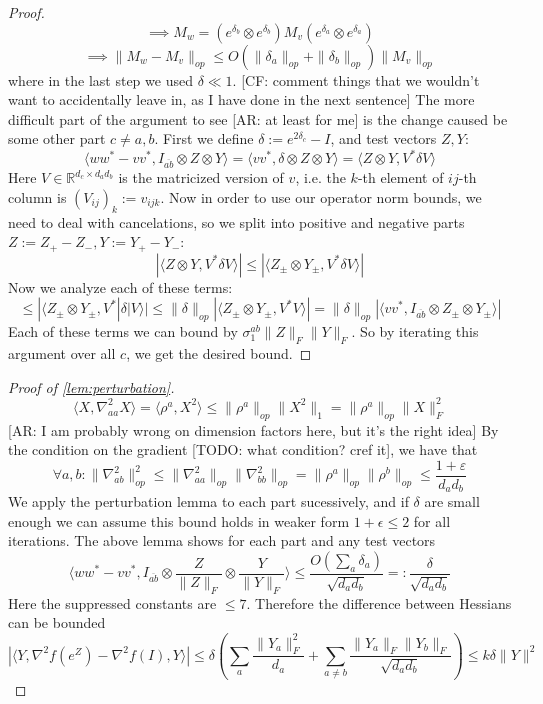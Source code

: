 \documentclass{article}
\newcommand{\R}{{\mathbb{R}}}
\newcommand\eps{\varepsilon}
\newcommand{\CF}[1]{{\color{purple}[CF: #1]}}
\newcommand{\AR}[1]{{\color{orange}[AR: #1]}}
\newcommand{\TODO}[1]{{\color{blue}[TODO: #1]}}
\begin{document}
\begin{proof}
\[ \implies M_{w} = (e^{\delta_{b}} \otimes e^{\delta_{b}}) M_{v} (e^{\delta_{a}} \otimes e^{\delta_{a}})   \]
\[ \implies \|M_{w} - M_{v}\|_{op} \leq O(\|\delta_{a}\|_{op} + \|\delta_{b}\|_{op}) \|M_{v}\|_{op}   \]
where in the last step we used $\delta \ll 1$.
\CF{comment things that we wouldn't want to accidentally leave in, as I have done in the next sentence}
The more difficult part of the argument to see \AR{at least for me} is the change caused be some other part $c \neq a,b$. First we define $\delta := e^{2 \delta_{c}} - I$, and test vectors $Z,Y$:
\[ \langle w w^{*} - v v^{*}, I_{\overline{ab}} \otimes Z \otimes Y \rangle = \langle v v^{*}, \delta \otimes Z \otimes Y \rangle  = \langle Z \otimes Y, V^{*} \delta V \rangle \]
Here $V \in \R^{d_{c} \times d_{a}d_{b}}$ is the matricized version of $v$, i.e. the $k$-th element of $ij$-th column is $(V_{ij})_{k} := v_{ijk}$. Now in order to use our operator norm bounds, we need to deal with cancelations, so we split into positive and negative parts $Z := Z_{+} - Z_{-}, Y := Y_{+} - Y_{-}$:
\[ |\langle Z \otimes Y, V^{*} \delta V \rangle| \leq |\langle Z_{\pm} \otimes Y_{\pm}, V^{*} \delta V \rangle |  \]
Now we analyze each of these terms:
\[ \leq |\langle Z_{\pm} \otimes Y_{\pm}, V^{*} |\delta| V \rangle| \leq \|\delta\|_{op} |\langle Z_{\pm} \otimes Y_{\pm}, V^{*} V \rangle| = \|\delta\|_{op} |\langle v v^{*}, I_{\overline{ab}} \otimes Z_{\pm} \otimes Y_{\pm} \rangle|   \]
Each of these terms we can bound by $\sigma^{ab}_{1} \|Z\|_{F} \|Y\|_{F}$. So by iterating this argument over all $c$, we get the desired bound.
\end{proof}

\begin{proof}[Proof of \cref{lem:perturbation}]
\[ \langle X, \nabla_{aa}^{2} X \rangle = \langle \rho^{a}, X^{2} \rangle \leq \|\rho^{a}\|_{op} \|X^{2}\|_{1} = \|\rho^{a}\|_{op} \|X\|_{F}^{2} \]
\AR{I am probably wrong on dimension factors here, but it's the right idea}
By the condition on the gradient \TODO{what condition? cref it}, we have that
\[ \forall a,b: \|\nabla_{ab}^{2}\|_{op}^{2} \leq \|\nabla_{aa}^{2}\|_{op} \|\nabla_{bb}^{2}\|_{op} = \|\rho^{a}\|_{op} \|\rho^{b}\|_{op} \leq \frac{1+\eps}{d_{a} d_{b}}   \]
We apply the perturbation lemma to each part sucessively, and if $\delta$ are small enough we can assume this bound holds in weaker form $1+\epsilon \leq 2$ for all iterations. The above lemma shows for each part and any test vectors
\[ \langle w w^{*} - v v^{*}, I_{\overline{ab}} \otimes \frac{Z}{\|Z\|_{F}} \otimes \frac{Y}{\|Y\|_{F}} \rangle \leq \frac{O( \sum_{a} \delta_{a} )}{\sqrt{d_{a} d_{b}}} =: \frac{\delta}{\sqrt{d_{a} d_{b}}}   \]
Here the suppressed constants are $\leq 7$. Therefore the difference between Hessians can be bounded
\[ |\langle Y, \nabla^{2} f(e^{Z}) - \nabla^{2} f(I), Y \rangle|  \leq \delta \left( \sum_{a} \frac{\|Y_{a}\|_{F}^{2}}{d_{a}} + \sum_{a \neq b} \frac{\|Y_{a}\|_{F} \|Y_{b}\|_{F}}{\sqrt{d_{a} d_{b}}} \right) \leq k \delta \|Y\|^{2}   \]
\end{proof}
\end{document}
